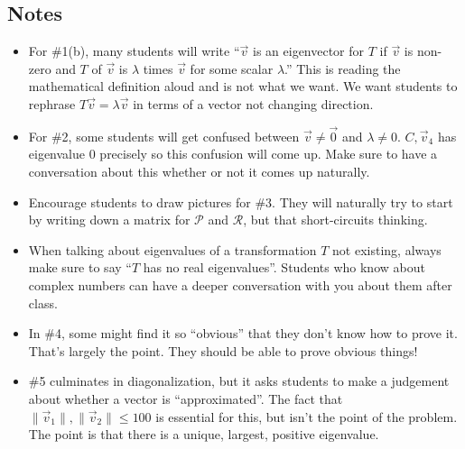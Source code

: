 \documentclass[red]{tutorial}
\theoremstyle{definition}
\theoremstyle{theorem}
\begin{document}
{\begin{instructions}
  \subsection*{Notes}
  \begin{itemize}
    \item For \#1(b), many students will write ``$\vec v$ is an eigenvector for $T$ if
      $\vec v$ is non-zero and $T$ of $\vec v$ is $\lambda$ times $\vec v$ for some scalar
      $\lambda$.'' This is reading the mathematical definition aloud and is not what we want.
      We want students to rephrase $T\vec v=\lambda \vec v$ in terms of a vector not changing
      direction.
    \item For \#2, some students will get confused between $\vec v\neq \vec 0$ and $\lambda \neq 0$.
      $C,\vec v_4$ has eigenvalue $0$ precisely so this confusion will come up. Make sure to
      have a conversation about this whether or not it comes up naturally.
    \item Encourage students to draw pictures for \#3. They will naturally try to start by writing
      down a matrix for $\mathcal P$ and $\mathcal R$, but that short-circuits thinking.
    \item
      When talking about eigenvalues of a transformation $T$
      not existing, always make sure to say ``$T$ has no real eigenvalues''. Students who
      know about complex numbers can have a deeper conversation with you about them after class.
    \item In \#4, some might find it so ``obvious'' that they don't know how to prove it. That's largely
      the point. They should be able to prove obvious things!
    \item \#5 culminates in diagonalization, but it asks students to make a judgement about whether
      a vector is ``approximated''. The fact that $\|\vec v_1\|,\|\vec v_2\|\leq 100$ is essential
      for this, but isn't the point of the problem. The point is that there is a unique, largest, positive
      eigenvalue.

  \end{itemize}
\end{instructions}
}
\end{document}
